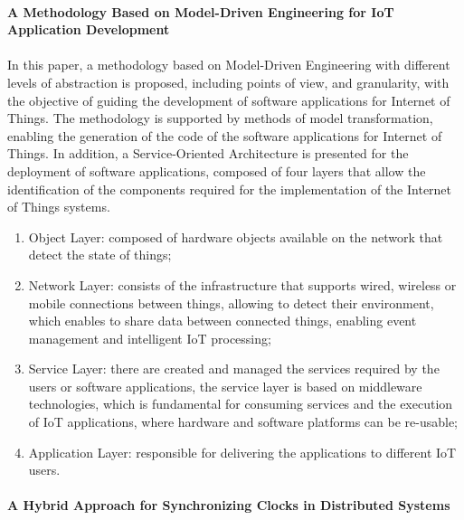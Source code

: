 \documentclass{article}
\begin{document}
\paragraph{A Methodology Based on Model-Driven Engineering for IoT Application Development} 

\paragraph{}

In this paper, a methodology based on Model-Driven Engineering with different levels of abstraction is proposed, including points of view, and granularity, with the objective of guiding the development of software applications for Internet of Things. The methodology is supported by methods of model transformation, enabling the generation of the code of the software applications for Internet of Things\cite{ref6}. In addition, a Service-Oriented Architecture is presented for the deployment of software applications, composed of four layers that allow the identification of the components required for the implementation of the Internet of Things systems.

\begin{enumerate}
  \item Object Layer: composed of hardware objects available on the network that detect the state of things; 
  \item Network Layer: consists of the infrastructure that supports wired, wireless or mobile connections between things, allowing to detect their environment, which enables to share data between connected things, enabling event management and intelligent IoT processing; 
  \item Service Layer: there are created and managed the services required by the users or software applications, the service layer is based on middleware technologies, which is fundamental for consuming services and the execution of IoT applications, where hardware and software platforms can be re-usable;
  \item Application Layer: responsible for delivering the applications to different IoT users.
\end{enumerate}

\paragraph{A Hybrid Approach for Synchronizing Clocks in Distributed Systems} 

\paragraph{}
\end{document}

